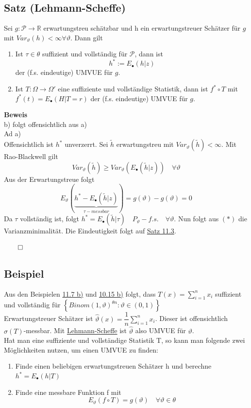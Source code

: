 \documentclass[german,10pt,oneside, fleqn, a4paper]{article}
\newcommand {\R}	{\mathbb{R}}
\newcommand{\ra}{\rightarrow}
\newcommand{\sm}[2][\infty]{\sum\limits_{#2}^{#1}}
\newcommand{\brac}[1]{\left\lbrace #1\right\rbrace}
\newcommand{\QED}{\begin{flushright}$\qed$\end{flushright}}
\newcommand{\mc}[1]{\mathcal{#1}}
\newcommand{\beweis}{\textbf{Beweis}\\}
\newcommand{\1}[1]{1_{#1}}
\newcommand{\2}[1]{\1{\brac{#1}}}
\newcommand{\sumi}{\sm[n]{i=1}}
\begin{document}
\subsection{Satz (Lehmann-Scheffe)}
\label{11.8}
Sei $g:\mc{P}\ra\R$ erwartungstreu schätzbar und h ein erwartungstreuer Schätzer für $g$ mit $Var_\vartheta(h)<\infty\forall\vartheta$. Dann gilt\begin{enumerate}[label=(\alph*)]
\item Ist $\tau\in\theta$ suffizient und vollständig für $\mc{P}$, dann ist \[
h^*:=E_\bullet(h|z)\]
der (f.s. eindeutige) UMVUE für $g$.
\item Ist $T:\Omega\ra\Omega'$ eine suffiziente und vollständige Statistik, dann ist $f^*\circ T$ mit $f^*(t)=E_\bullet(H|T=r)$ der (f.s. eindeutige) UMVUE für $g$.
\end{enumerate}
\beweis
b) folgt offensichtlich aus a)\\
Ad a)\\
Offensichtlich ist $h^*$ unverzerrt. Sei $\tilde{h}$ erwartungstreu mit $Var_\vartheta(\tilde{h})<\infty$. Mit Rao-Blackwell gilt \[
Var_\vartheta(\tilde{h})\geq Var_\vartheta(E_\bullet(\tilde{h}|z))\quad\forall\vartheta\]
Aus der Erwartungstreue folgt \[
E_\vartheta(\underbrace{h^*-E_\bullet(\tilde{h}|z)}_{\tau-messbar})=g(\vartheta)-g(\vartheta)=0\]
Da $\tau$ vollständig ist, folgt $h^*=E_\bullet(\tilde{h}|\tau)\quad P_\vartheta-f.s.\quad\forall\vartheta$. Nun folgt aus $(*)$ die Varianzminimalität. Die Eindeutigkeit folgt auf \hyperref[11.3]{Satz 11.3}.\QED


\subsection{Beispiel}
\label{11.9}
Aus den Beispielen \hyperref[11.7]{11.7 b)} und \hyperref[10.15]{10.15 b)} folgt, dass $T(x)=\sumi x_i$ suffizient und vollständig für $\brac{Binom(1,\vartheta)^{\theta  n}:\vartheta\in(0,1)}$\\
Erwartungstreuer Schätzer ist $\widehat{\vartheta}(x)=\dfrac{1}{n}\sumi x_i$. Dieser ist offensichtlich $\sigma(T)$-messbar. Mit \hyperref[11.8]{Lehmann-Scheffe} ist $\widehat{\vartheta}$ also UMVUE für $\vartheta$.\\
Hat man eine suffiziente und vollständige Statistik T, so kann man folgende zwei Möglichkeiten nutzen, um einen UMVUE zu finden:\begin{enumerate}[label=(\roman*)]
\item Finde einen beliebigen erwartungstreuen Schätzer h und berechne $h^*=E_\bullet(h|T)$
\item Finde eine messbare Funktion f mit \[E_\vartheta(f\circ T)=g(\vartheta)\quad\forall\vartheta\in\theta\]
\end{enumerate}
\end{document}
